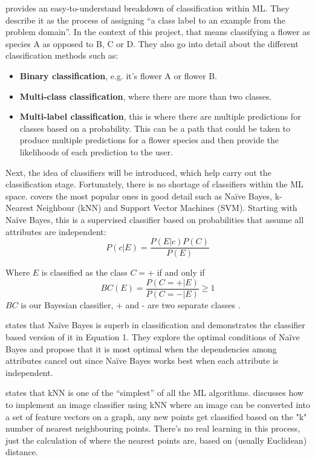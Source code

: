 \documentclass[12pt,a4paper]{report}
\begin{document}
\citet{brownlee2020} provides an easy-to-understand breakdown of classification within ML. They describe it 
as the process of assigning “a class label to an example from the problem domain”. In the context of this project, that 
means classifying a 
flower as species A as opposed to B, C or D. They also go into detail about the different classification methods such 
as:
\begin{itemize}
    \item \textbf{Binary classification}, e.g. it's flower A or flower B.
    \item \textbf{Multi-class classification}, where there are more than two classes.
    \item \textbf{Multi-label classification}, this is where there are multiple predictions for classes based on a probability. 
    This can be a path that could be taken to produce multiple predictions for a flower species and then provide 
    the likelihoods of each prediction to the user.
\end{itemize}
Next, the idea of classifiers will be introduced, which help carry out the classification stage. Fortunately, 
there is no shortage of classifiers within the ML space. \citet{MohammedMohssen2017Ml:a} covers the most popular ones in 
good detail such as Naïve Bayes, k-Nearest Neighbour (kNN) and Support Vector Machines (SVM). Starting with Naïve Bayes, this 
is a supervised classifier based on probabilities that assume all attributes are independent:
\begin{equation}
P(c|E) = \frac{P(E|c)P(C)}{P(E)}
\end{equation}

Where \(E\) is classified as the class \(C = +\) if and only if
\[BC(E) = \frac{P(C = +|E)}{P(C = -|E)} \geq 1\]
\(BC\) is our Bayesian classifier, + and - are two separate classes \citep{zhang2004optimality}.

\par

\citet{zhang2004optimality} states that Naïve Bayes is superb in classification and demonstrates the
classifier based version of it in Equation 1. They explore the optimal conditions of Naïve Bayes and propose
that it is most optimal when the dependencies among attributes cancel out since Naïve Bayes works best when each 
attribute is independent.

\par

\citet{MohammedMohssen2017Ml:a} states that kNN is one of the “simplest” of  all the 
ML algorithms. \citet{rosebook2016} discusses how to implement an image classifier using kNN where 
an image can be converted into a set of feature vectors on a graph, any new points get classified based on the "k" 
number of 
nearest neighbouring points. There's no real learning in this process, just the calculation of where the nearest points 
are, based on (usually Euclidean) distance.
\end{document}
